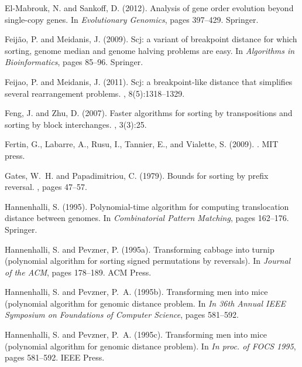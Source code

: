 \documentclass[11pt,final,twoside,nofrench]{thlifl}
\begin{document}
\begin{thebibliography}{}
El-Mabrouk, N. and Sankoff, D. (2012).
\newblock Analysis of gene order evolution beyond single-copy genes.
\newblock In {\em Evolutionary Genomics}, pages 397--429. Springer.

Feij{\~a}o, P. and Meidanis, J. (2009).
\newblock Scj: a variant of breakpoint distance for which sorting, genome
  median and genome halving problems are easy.
\newblock In {\em Algorithms in Bioinformatics}, pages 85--96. Springer.

Feijao, P. and Meidanis, J. (2011).
\newblock Scj: a breakpoint-like distance that simplifies several rearrangement
  problems.
, 8(5):1318--1329.

Feng, J. and Zhu, D. (2007).
\newblock Faster algorithms for sorting by transpositions and sorting by block
  interchanges.
, 3(3):25.

Fertin, G., Labarre, A., Rusu, I., Tannier, E., and Vialette, S. (2009).
.
\newblock MIT press.

Gates, W.~H. and Papadimitriou, C. (1979).
\newblock Bounds for sorting by prefix reversal.
, pages 47--57.

Hannenhalli, S. (1995).
\newblock Polynomial-time algorithm for computing translocation distance
  between genomes.
\newblock In {\em Combinatorial Pattern Matching}, pages 162--176. Springer.

Hannenhalli, S. and Pevzner, P. (1995a).
\newblock Transforming cabbage into turnip (polynomial algorithm for sorting
  signed permutations by reversals).
\newblock In {\em Journal of the ACM}, pages 178--189. ACM Press.

Hannenhalli, S. and Pevzner, P.~A. (1995b).
\newblock Transforming men into mice (polynomial algorithm for genomic distance
  problem.
\newblock In {\em In 36th Annual IEEE Symposium on Foundations of Computer
  Science}, pages 581--592.

Hannenhalli, S. and Pevzner, P.~A. (1995c).
\newblock Transforming men into mice (polynomial algorithm for genomic distance
  problem).
\newblock In {\em In proc. of FOCS 1995}, pages 581--592. IEEE Press.


\end{thebibliography}
\end{document}
